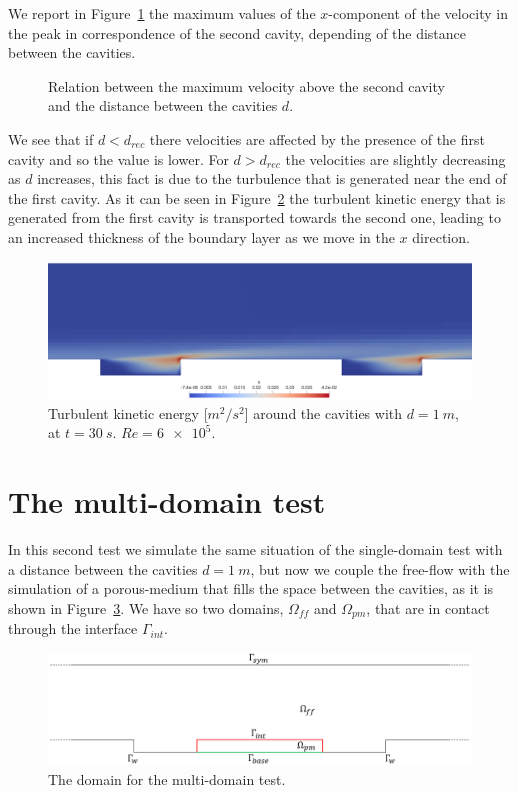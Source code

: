 \documentclass[11pt, a4paper]{article}
\theoremstyle{definition}
\begin{document}
We report in Figure~\ref{fig:velpeaks} the maximum values of the $x$-component 
of the velocity in the peak in correspondence of the second cavity, depending 
of the distance between the cavities.
\begin{figure}
	\centering
	
	\caption{Relation between the maximum velocity above the second cavity and 
	the distance between the cavities $d$.}
	\label{fig:velpeaks}
\end{figure}
We see that if $d < d_{rec}$ there velocities are affected by the presence of 
the first cavity and so the value is lower. For $d>d_{rec}$ the velocities are 
slightly decreasing as $d$ increases, this fact is due to the turbulence that 
is generated near the end of the first cavity. As it can be seen in 
Figure~\ref{fig:kd1} the turbulent kinetic energy that is generated from the 
first cavity is transported towards the second one, leading to an increased 
thickness of the boundary layer as we move in the $x$ direction.
\begin{figure}
	\centering
	\includegraphics[width=\textwidth, trim={0 0 0 7cm}, 
	clip]{cavities_dist1_k}
	\caption{Turbulent kinetic energy [$\si{m^2/s^2}$] around the cavities with 
		$d=\SI{1}{m}$, at $t=\SI{30}{s}$. $Re=\num{6e5}$.}
	\label{fig:kd1}
\end{figure}

\FloatBarrier
\section{The multi-domain test}
In this second test we simulate the same situation of the single-domain test 
with a distance between the cavities $d=\SI{1}{m}$, but now we couple the 
free-flow with the simulation of a porous-medium that fills the space between 
the cavities, as it is shown in Figure~\ref{fig:multidomain}. We have so two 
domains, $\Omega_{ff}$ and $\Omega_{pm}$, that are in contact through the 
interface $\Gamma_{int}$.
\begin{figure}[h]
	\centering
	\includegraphics[width=\textwidth]{cavities_multidomain.png}
	\caption{The domain for the multi-domain test.}
	\label{fig:multidomain}
\end{figure}
\end{document}
